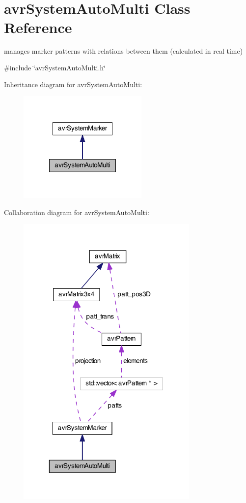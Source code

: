 \hypertarget{classavr_system_auto_multi}{\section{avr\-System\-Auto\-Multi Class Reference}
\label{classavr_system_auto_multi}
}


manages marker patterns with relations between them (calculated in real time)  




{\ttfamily \#include \char`\"{}avr\-System\-Auto\-Multi.\-h\char`\"{}}



Inheritance diagram for avr\-System\-Auto\-Multi\-:\nopagebreak
\begin{figure}[H]
\begin{center}
\leavevmode
\includegraphics[width=180pt]{classavr_system_auto_multi__inherit__graph}
\end{center}
\end{figure}


Collaboration diagram for avr\-System\-Auto\-Multi\-:\nopagebreak
\begin{figure}[H]
\begin{center}
\leavevmode
\includegraphics[width=253pt]{classavr_system_auto_multi__coll__graph}
\end{center}
\end{figure}
